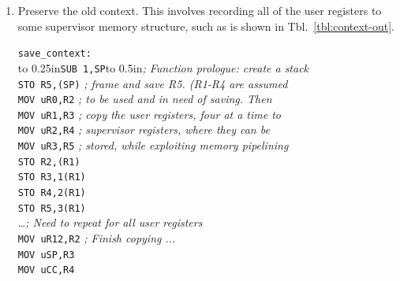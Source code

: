 \documentclass{gqtekspec}
\begin{document}
\begin{enumerate}
\item Preserve the old context.  This involves recording all of the user
	registers to some supervisor memory structure, such as is shown in
	Tbl.~\ref{tbl:context-out}.
\begin{table}\begin{center}
\begin{tabbing}
{\tt save\_context:} \\
\hbox to 0.25in{}\={\tt SUB 1,SP}\hbox to 0.5in{}\= {\em ; Function prologue: create a stack}\\
\>        {\tt STO R5,(SP)}	\> {\em ; frame and save R5.  (R1-R4 are assumed}\\
\>        {\tt MOV uR0,R2}	\> {\em ; to be used and in need of saving.  Then}\\
\>        {\tt MOV uR1,R3}	\> {\em ; copy the user registers, four at a time to }\\
\>        {\tt MOV uR2,R4}	\> {\em ; supervisor registers, where they can be}\\
\>        {\tt MOV uR3,R5}	\> {\em ; stored, while exploiting memory pipelining}\\
\>        {\tt STO R2,(R1)}	\\
\>        {\tt STO R3,1(R1)}	\\
\>        {\tt STO R4,2(R1)}	\\
\>        {\tt STO R5,3(R1)} \\
\>	\ldots {\em ; Need to repeat for all user registers} \\

\>        {\tt MOV uR12,R2}	\> {\em ; Finish copying ... } \\
\>        {\tt MOV uSP,R3} \\
\>        {\tt MOV uCC,R4} \\

\end{tabbing}
\end{center}
\end{table}
\end{enumerate}
\end{document}
